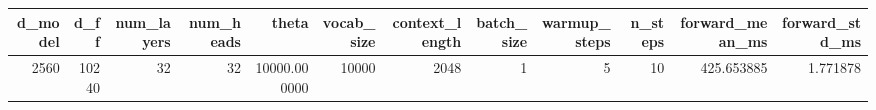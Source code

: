 \begin{tabular}{rrrrrrrrrrrr}
\toprule
d_model & d_ff & num_layers & num_heads & theta & vocab_size & context_length & batch_size & warmup_steps & n_steps & forward_mean_ms & forward_std_ms \\
\midrule
2560 & 10240 & 32 & 32 & 10000.000000 & 10000 & 2048 & 1 & 5 & 10 & 425.653885 & 1.771878 \\
\bottomrule
\end{tabular}
